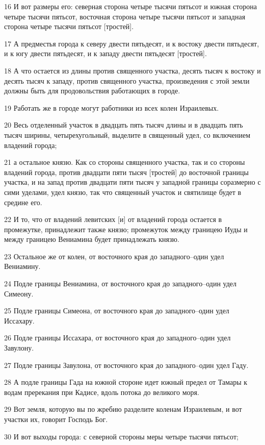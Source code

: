 \par 16 И вот размеры его: северная сторона четыре тысячи пятьсот и южная сторона четыре тысячи пятьсот, восточная сторона четыре тысячи пятьсот и западная сторона четыре тысячи пятьсот [тростей].
\par 17 А предместья города к северу двести пятьдесят, и к востоку двести пятьдесят, и к югу двести пятьдесят, и к западу двести пятьдесят [тростей].
\par 18 А что остается из длины против священного участка, десять тысяч к востоку и десять тысяч к западу, против священного участка, произведения с этой земли должны быть для продовольствия работающих в городе.
\par 19 Работать же в городе могут работники из всех колен Израилевых.
\par 20 Весь отделенный участок в двадцать пять тысяч длины и в двадцать пять тысяч ширины, четырехугольный, выделите в священный удел, со включением владений города;
\par 21 а остальное князю. Как со стороны священного участка, так и со стороны владений города, против двадцати пяти тысяч [тростей] до восточной границы участка, и на запад против двадцати пяти тысяч у западной границы соразмерно с сими уделами, удел князю, так что священный участок и святилище будет в средине его.
\par 22 И то, что от владений левитских [и] от владений города остается в промежутке, принадлежит также князю; промежуток между границею Иуды и между границею Вениамина будет принадлежать князю.
\par 23 Остальное же от колен, от восточного края до западного--один удел Вениамину.
\par 24 Подле границы Вениамина, от восточного края до западного--один удел Симеону.
\par 25 Подле границы Симеона, от восточного края до западного--один удел Иссахару.
\par 26 Подле границы Иссахара, от восточного края до западного--один удел Завулону.
\par 27 Подле границы Завулона, от восточного края до западного--один удел Гаду.
\par 28 А подле границы Гада на южной стороне идет южный предел от Тамары к водам пререкания при Кадисе, вдоль потока до великого моря.
\par 29 Вот земля, которую вы по жребию разделите коленам Израилевым, и вот участки их, говорит Господь Бог.
\par 30 И вот выходы города: с северной стороны меры четыре тысячи пятьсот;
